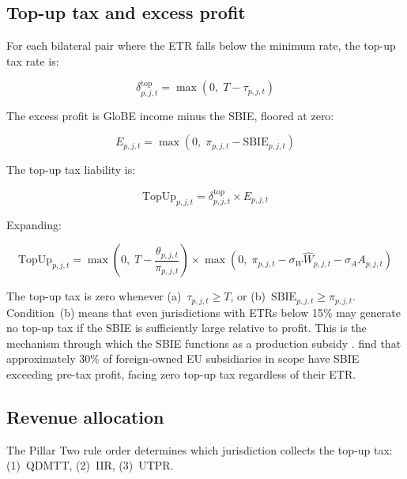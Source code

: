 \documentclass[11pt,a4paper]{article}
\begin{document}
\subsection{Top-up tax and excess profit}\label{sec:topup}

For each bilateral pair where the ETR falls below the minimum rate, the top-up tax rate is:

\begin{equation}\label{eq:topup_rate}
\delta_{p,j,t}^{\text{top}} = \max\!\left(0,\; T - \tau_{p,j,t}\right)
\end{equation}

The excess profit is GloBE income minus the SBIE, floored at zero:

\begin{equation}\label{eq:excess}
E_{p,j,t} = \max\!\left(0,\; \pi_{p,j,t} - \text{SBIE}_{p,j,t}\right)
\end{equation}

The top-up tax liability is:

\begin{equation}\label{eq:topup_tax}
\text{TopUp}_{p,j,t} = \delta_{p,j,t}^{\text{top}} \times E_{p,j,t}
\end{equation}

Expanding:

\begin{equation}\label{eq:topup_expanded}
\text{TopUp}_{p,j,t} = \max\!\left(0,\; T - \frac{\theta_{p,j,t}}{\pi_{p,j,t}}\right) \times \max\!\left(0,\; \pi_{p,j,t} - \sigma_W \hat{W}_{p,j,t} - \sigma_A A_{p,j,t}\right)
\end{equation}

The top-up tax is zero whenever (a)~$\tau_{p,j,t} \geq T$, or (b)~$\text{SBIE}_{p,j,t} \geq \pi_{p,j,t}$. Condition~(b) means that even jurisdictions with ETRs below 15\% may generate no top-up tax if the SBIE is sufficiently large relative to profit. This is the mechanism through which the SBIE functions as a production subsidy \citep{schjelderup2024}. \citet{devereux2023} find that approximately 30\% of foreign-owned EU subsidiaries in scope have SBIE exceeding pre-tax profit, facing zero top-up tax regardless of their ETR.

\subsection{Revenue allocation}\label{sec:allocation}

The Pillar Two rule order determines which jurisdiction collects the top-up tax: (1)~QDMTT, (2)~IIR, (3)~UTPR.
\end{document}
